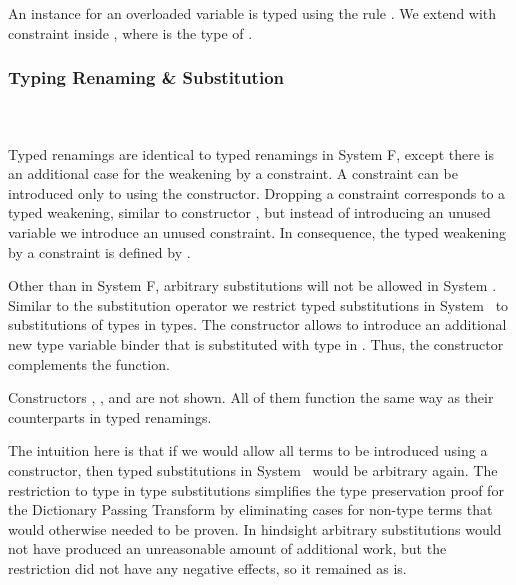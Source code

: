 \noindent An instance for an overloaded variable  is typed using the rule . We extend  with constraint  \Constr{:}  inside , where  is the type of . 

\subsubsection{Typing Renaming \& Substitution}\hfill\\\\
Typed renamings are identical to typed renamings in System F, except there is an additional case for the weakening by a constraint. 
\FoRenTyping
A constraint  \Constr{:}  can be introduced only to  using the  constructor. 
Dropping a constraint corresponds to a typed weakening, similar to constructor , but instead of introducing an unused variable we introduce an unused constraint. In consequence, the typed weakening by a constraint  is defined by  .

\noindent Other than in System F, arbitrary substitutions will not be allowed in System \Fo. 
Similar to the substitution operator we restrict typed substitutions in System \Fo\ to substitutions of types in types. 
\FoSubTyping
\noindent The constructor  allows to introduce an additional new type variable binder that is substituted with type  in .
Thus, the constructor  complements the  function.  

\noindent Constructors  , ,  and  are not shown. All of them function the same way as their counterparts in typed renamings.

\noindent The intuition here is that if we would allow all terms to be introduced using a  constructor, then typed substitutions in System \Fo\ would be arbitrary again. The restriction to type in type substitutions simplifies the type preservation proof for the Dictionary Passing Transform by eliminating cases for non-type terms that would otherwise needed to be proven. In hindsight arbitrary substitutions would not have produced an unreasonable amount of additional work, but the restriction did not have any negative effects, so it remained as is.  